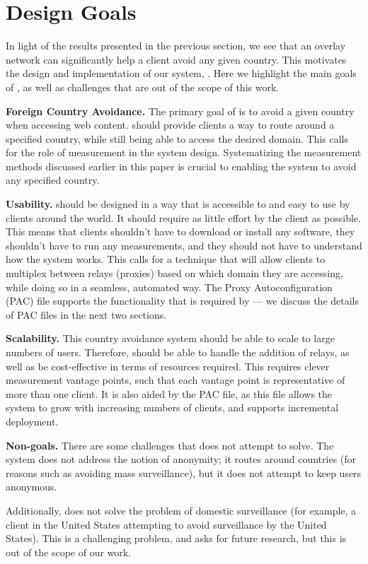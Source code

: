 \section{Design Goals}
\label{goals}
In light of the results presented in the previous section, we see that an 
overlay network can significantly help a client avoid any given country.  This motivates
 the design and implementation of our system, \system.  Here we highlight the main goals of 
\system{}, as well as challenges that are out of the scope of this work.

{\bf Foreign Country Avoidance.}  The primary goal of \system{} is to avoid a given
 country when accessing web content.  \system{} should provide clients a way to 
route around a specified country, while still being able to access the desired 
domain.  This calls for the role of measurement in the system design.  Systematizing 
the measurement methods discussed earlier in this paper is crucial to enabling the 
system to avoid any specified country.

{\bf Usability.} \system{} should be designed in a way that is accessible to and 
easy to use by clients around the world.  It should require as little effort by 
the client as possible.  This means that clients shouldn't have to download or 
install any software, they shouldn't have to run any measurements, and they 
should not have to understand how the system works.  This calls for a technique 
that will allow clients to multiplex between relays (proxies) based on which domain they 
are accessing, while doing so in a seamless, automated way.  The Proxy Autoconfiguration (PAC) 
file supports the functionality that is required by \system{} --- we discuss the details 
of PAC files in the next two sections.  

{\bf Scalability.}  This country avoidance system should be able to scale to 
large numbers of users.  Therefore, \system{} should be able to handle the addition
 of relays, as well as be cost-effective in terms of resources required. This requires 
clever measurement vantage points, such that each vantage point is representative of 
more than one client.  It is also aided by the PAC file, as this file allows the system to 
grow with increasing numbers of clients, and supports incremental deployment.

{\bf Non-goals.}  There are some challenges that \system{} does not attempt to 
solve.  The system does not address the notion of anonymity; it routes around 
countries (for reasons such as avoiding mass surveillance), but it does not 
attempt to keep users anonymous.  

Additionally, \system{} does not solve the problem of domestic surveillance (for 
example, a client in the United States attempting to avoid surveillance by the 
United States).  This is a challenging problem, and asks for future research, 
but this is out of the scope of our work.
